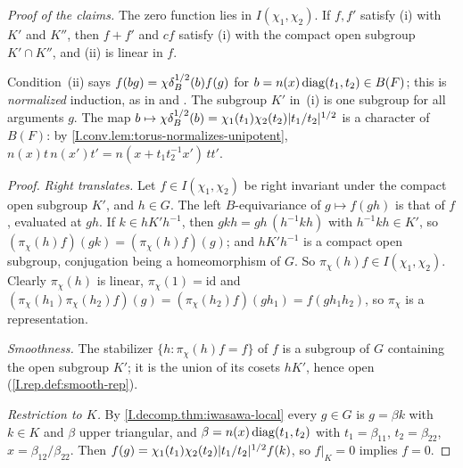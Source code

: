 \begin{definition}
\end{definition}

\noindent\emph{Proof of the claims.} The zero function lies in $I(\chi_1,\chi_2)$. If $f,f'$ satisfy (i) with $K'$ and
$K''$, then $f+f'$ and $cf$ satisfy (i) with the compact open subgroup $K'\cap K''$, and (ii) is linear in $f$.

\noindent Condition~(ii) says $f(bg)=\chi\delta_B^{1/2}(b)f(g)$ for $b=n(x)\operatorname{diag}(t_1,t_2)\in B(F)$; this is \emph{normalized}
induction, as in \cite[(3.1)]{JL} and \cite[§3.1]{Cas-p}. The subgroup $K'$ in~(i) is one subgroup for all arguments $g$.
The map $b\mapsto\chi\delta_B^{1/2}(b)=\chi_1(t_1)\chi_2(t_2)\lvert t_1/t_2\rvert^{1/2}$ is a character of $B(F)$: by
\cref{I.conv.lem:torus-normalizes-unipotent}, $n(x)t\,n(x')t'=n(x+t_1t_2^{-1}x')\,tt'$.

\begin{theorem}
\end{theorem}
\begin{proof}
\emph{Right translates.} Let $f\in I(\chi_1,\chi_2)$ be right invariant under the compact open subgroup $K'$, and
$h\in G$. The left $B$-equivariance of $g\mapsto f(gh)$ is that of $f$, evaluated at $gh$. If $k\in hK'h^{-1}$, then
$gkh=gh\,(h^{-1}kh)$ with $h^{-1}kh\in K'$, so $(\pi_\chi(h)f)(gk)=(\pi_\chi(h)f)(g)$; and $hK'h^{-1}$ is a compact
open subgroup, conjugation being a homeomorphism of $G$. So $\pi_\chi(h)f\in I(\chi_1,\chi_2)$. Clearly $\pi_\chi(h)$ is
linear, $\pi_\chi(1)=\mathrm{id}$ and $(\pi_\chi(h_1)\pi_\chi(h_2)f)(g)=(\pi_\chi(h_2)f)(gh_1)=f(gh_1h_2)$, so $\pi_\chi$ is
a representation.

\emph{Smoothness.} The stabilizer $\{h:\pi_\chi(h)f=f\}$ of $f$ is a subgroup of $G$ containing the open subgroup $K'$;
it is the union of its cosets $hK'$, hence open (\cref{I.rep.def:smooth-rep}).

\emph{Restriction to $K$.} By \cref{I.decomp.thm:iwasawa-local} every $g\in G$ is $g=\beta k$ with $k\in K$ and
$\beta$ upper triangular, and $\beta=n(x)\operatorname{diag}(t_1,t_2)$ with $t_1=\beta_{11}$, $t_2=\beta_{22}$,
$x=\beta_{12}/\beta_{22}$. Then $f(g)=\chi_1(t_1)\chi_2(t_2)\lvert t_1/t_2\rvert^{1/2}f(k)$, so $f|_K=0$ implies $f=0$.
\end{proof}

